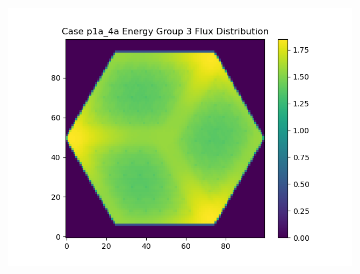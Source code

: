 \documentclass[letterpaper,11pt]{report}
\begin{document}
\begin{figure}[H]
\begin{subfigure}{.33\textwidth}
            \includegraphics[width=1.1\linewidth]{../../phase1a/case4a/analysis_output/p1a_4a_e_eg3.png}
            \caption{}
          \end{subfigure}


\end{figure}
\end{document}
